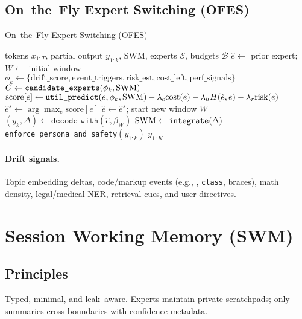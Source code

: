 \documentclass[11pt]{article}
\DeclareRobustCommand{\SWM}{\ifmmode\mathrm{SWM}\else\textsc{SWM}\fi}
\begin{document}
\subsection{On--the--Fly Expert Switching (OFES)}
\begin{algorithm}[h]
\caption{On--the--Fly Expert Switching (OFES)}
\label{alg:ofes}
\begin{algorithmic}[1]
\Require tokens $x_{1:T}$, partial output $y_{1:k}$, \SWM, experts $\mathcal{E}$, budgets $\mathcal{B}$
\State $\hat{e} \gets$ prior expert; $W \gets$ initial window
    \State $\phi_k \gets \{\text{drift\_score}, \text{event\_triggers}, \text{risk\_est}, \text{cost\_left}, \text{perf\_signals}\}$
        \State $C \gets \texttt{candidate\_experts}(\phi_k,\SWM)$
            \State $\mathrm{score}[e] \gets \texttt{util\_predict}(e,\phi_k,\SWM) - \lambda_c \mathrm{cost}(e) - \lambda_h H(\hat{e},e) - \lambda_r \mathrm{risk}(e)$
        \EndFor
        \State $\hat{e}^\star \gets \arg\max_{e} \mathrm{score}[e]$
            \State $\hat{e} \gets \hat{e}^\star$; start new window $W$
        \EndIf
    \EndIf
    \State $(y_k, \Delta) \gets \texttt{decode\_with}(\hat{e}, \beta_W)$ 
    \State $\SWM \gets \texttt{integrate}(\Delta)$ 
    \State \texttt{enforce\_persona\_and\_safety}$(y_{1:k})$
\EndFor
\State \Return $y_{1:K}$
\end{algorithmic}
\end{algorithm}

\paragraph{Drift signals.} Topic embedding deltas, code/markup events (e.g., \texttt{\textasciigrave\textasciigrave\textasciigrave}, \texttt{class}, braces), math density, legal/medical NER, retrieval cues, and user directives.

\section{Session Working Memory (\SWM)}
\subsection{Principles}
Typed, minimal, and leak--aware. Experts maintain private scratchpads; only summaries cross boundaries with confidence metadata.
\end{document}
